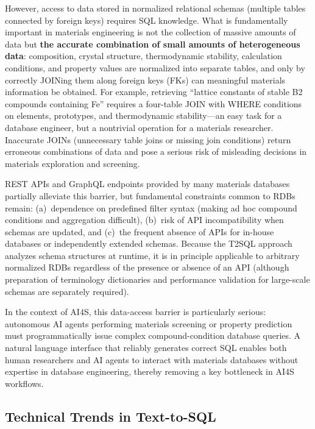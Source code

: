 \documentclass[5p,twocolumn]{elsarticle}
\begin{document}
However, access to data stored in normalized relational schemas
(multiple tables connected by foreign keys) requires SQL knowledge.
What is fundamentally important in materials engineering is not the collection of massive amounts of data but
\textbf{the accurate combination of small amounts of heterogeneous data}:
composition, crystal structure, thermodynamic stability, calculation conditions, and property values are
normalized into separate tables, and only by correctly JOINing them along foreign keys (FKs)
can meaningful materials information be obtained.
For example, retrieving ``lattice constants of stable B2 compounds containing Fe'' requires
a four-table JOIN with WHERE conditions on elements, prototypes, and thermodynamic stability---an easy task for a database engineer, but
a nontrivial operation for a materials researcher.
Inaccurate JOINs (unnecessary table joins or missing join conditions)
return erroneous combinations of data and pose a serious risk of misleading decisions in materials exploration and screening.

REST APIs and GraphQL endpoints provided by many materials databases
partially alleviate this barrier, but fundamental constraints common to RDBs remain:
(a)~dependence on predefined filter syntax (making ad hoc compound conditions and aggregation difficult),
(b)~risk of API incompatibility when schemas are updated, and
(c)~the frequent absence of APIs for in-house databases or independently extended schemas.
Because the T2SQL approach analyzes schema structures at runtime,
it is in principle applicable to arbitrary normalized RDBs regardless of the presence or absence of an API
(although preparation of terminology dictionaries and performance validation for large-scale schemas are separately required).

In the context of AI4S, this data-access barrier is particularly serious:
autonomous AI agents performing materials screening or property prediction
must programmatically issue complex compound-condition database queries.
A natural language interface that reliably generates correct SQL
enables both human researchers and AI agents to interact with materials databases without expertise in database engineering,
thereby removing a key bottleneck in AI4S workflows.

\subsection{Technical Trends in Text-to-SQL}
\end{document}
